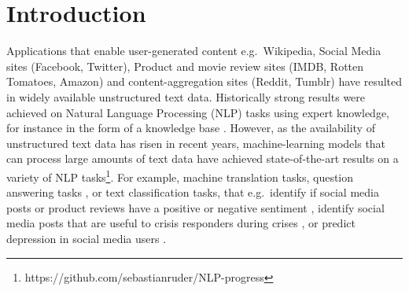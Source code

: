 \chapter{Introduction}\label{ch1}







Applications that enable user-generated content e.g.\ Wikipedia, Social Media sites (Facebook, Twitter), Product and movie review sites (IMDB, Rotten Tomatoes, Amazon) and content-aggregation sites (Reddit, Tumblr) have resulted in widely available unstructured text data. Historically strong results were achieved on Natural Language Processing (NLP) tasks using expert knowledge, for instance in the form of a knowledge base \cite{Lewis1993}. However, as the availability of unstructured text data has risen in recent years, machine-learning models that can process large amounts of  text  data have achieved state-of-the-art results on  a variety of NLP tasks\footnote{https://github.com/sebastianruder/NLP-progress}. For example, machine translation \cite{Wu} tasks, question answering tasks \cite{Fisch2016}, or text classification tasks, that e.g.\  identify if social media posts or product reviews have a positive or negative sentiment \cite{Burel2018},  identify social media posts  that are useful to crisis responders during crises \cite{Burel2018}, or  predict depression in social media users \cite{Aldarwish2017}. 


